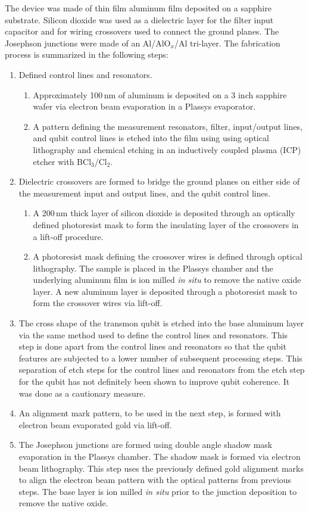 The device was made of thin film aluminum film deposited on a sapphire substrate. Silicon dioxide was used as a dielectric layer for the filter input capacitor and for wiring crossovers used to connect the ground planes. The Josephson junctions were made of an Al/AlO$_x$/Al tri-layer. The fabrication process is summarized in the following steps:
\begin{enumerate}
 \item{Defined control lines and resonators.}
 \begin{enumerate}
  \item{Approximately 100\,nm of aluminum is deposited on a 3 inch sapphire wafer via electron beam evaporation in a Plassys evaporator.}
  \item{A pattern defining the measurement resonators, filter, input/output lines, and qubit control lines is etched into the film using using optical lithography and chemical etching in an inductively coupled plasma (ICP) etcher with BCl$_3$/Cl$_2$.}
 \end{enumerate} 
 \item{Dielectric crossovers are formed to bridge the ground planes on either side of the measurement input and output lines, and the qubit control lines.}
 \begin{enumerate}
  \item{A 200\,nm thick layer of silicon dioxide is deposited through an optically defined photoresist mask to form the insulating layer of the crossovers in a lift-off procedure.}
  \item{A photoresist mask defining the crossover wires is defined through optical lithography. The sample is placed in the Plassys chamber and the underlying aluminum film is ion milled \emph{in situ} to remove the native oxide layer. A new aluminum layer is deposited through a photoresist mask to form the crossover wires via lift-off.}
 \end{enumerate}
 \item{The cross shape of the transmon qubit is etched into the base aluminum layer via the same method used to define the control lines and resonators. This step is done apart from the control lines and resonators so that the qubit features are subjected to a lower number of subsequent processing steps. This separation of etch steps for the control lines and resonators from the etch step for the qubit has not definitely been shown to improve qubit coherence. It was done as a cautionary measure.}
 \item{An alignment mark pattern, to be used in the next step, is formed with electron beam evaporated gold via lift-off.}
 \item{The Josephson junctions are formed using double angle shadow mask evaporation in the Plassys chamber. The shadow mask is formed via electron beam lithography. This step uses the previously defined gold alignment marks to align the electron beam pattern with the optical patterns from previous steps. The base layer is ion milled \emph{in situ} prior to the junction deposition to remove the native oxide.}
\end{enumerate}